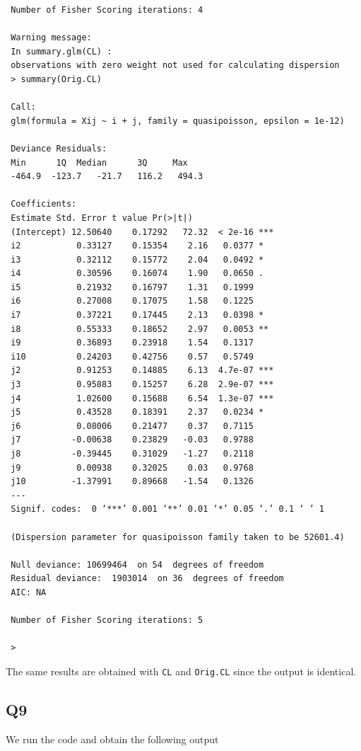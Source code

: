 \documentclass[11pt]{article}
\begin{document}
\begin{verbatim}
 Number of Fisher Scoring iterations: 4
 
 Warning message:
 In summary.glm(CL) :
 observations with zero weight not used for calculating dispersion
 > summary(Orig.CL)
 
 Call:
 glm(formula = Xij ~ i + j, family = quasipoisson, epsilon = 1e-12)
 
 Deviance Residuals: 
 Min      1Q  Median      3Q     Max  
 -464.9  -123.7   -21.7   116.2   494.3  
 
 Coefficients:
 Estimate Std. Error t value Pr(>|t|)    
 (Intercept) 12.50640    0.17292   72.32  < 2e-16 ***
 i2           0.33127    0.15354    2.16   0.0377 *  
 i3           0.32112    0.15772    2.04   0.0492 *  
 i4           0.30596    0.16074    1.90   0.0650 .  
 i5           0.21932    0.16797    1.31   0.1999    
 i6           0.27008    0.17075    1.58   0.1225    
 i7           0.37221    0.17445    2.13   0.0398 *  
 i8           0.55333    0.18652    2.97   0.0053 ** 
 i9           0.36893    0.23918    1.54   0.1317    
 i10          0.24203    0.42756    0.57   0.5749    
 j2           0.91253    0.14885    6.13  4.7e-07 ***
 j3           0.95883    0.15257    6.28  2.9e-07 ***
 j4           1.02600    0.15688    6.54  1.3e-07 ***
 j5           0.43528    0.18391    2.37   0.0234 *  
 j6           0.08006    0.21477    0.37   0.7115    
 j7          -0.00638    0.23829   -0.03   0.9788    
 j8          -0.39445    0.31029   -1.27   0.2118    
 j9           0.00938    0.32025    0.03   0.9768    
 j10         -1.37991    0.89668   -1.54   0.1326    
 ---
 Signif. codes:  0 ‘***’ 0.001 ‘**’ 0.01 ‘*’ 0.05 ‘.’ 0.1 ‘ ’ 1
 
 (Dispersion parameter for quasipoisson family taken to be 52601.4)
 
 Null deviance: 10699464  on 54  degrees of freedom
 Residual deviance:  1903014  on 36  degrees of freedom
 AIC: NA
 
 Number of Fisher Scoring iterations: 5
 
 >
\end{verbatim}

The same results are obtained with \verb|CL| and \verb|Orig.CL| since the output is identical.

\subsection*{Q9}

We run the code and obtain the following output 
\end{document}
